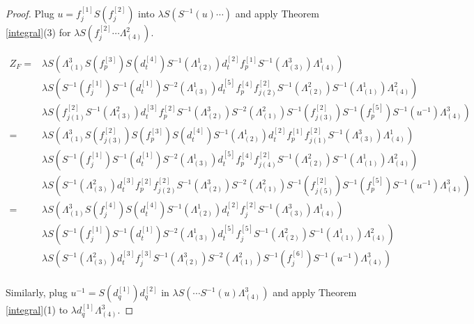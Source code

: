 \documentclass[12pt]{amsart}
\begin{document}
\begin{proof}
Plug $u=f^{[1]}_jS(f^{[2]}_j)$ into $\lambda S(S^{-1}(u)\cdots)$ and apply Theorem \ref{integral}(3) for $\lambda S(f^{[2]}_j\cdots\Lambda^2_{(4)})$.


\[\begin{aligned}
Z_F=&\lambda S(\Lambda^3_{(1)}S(f^{[3]}_p)S(d^{[4]}_t)S^{-1}(\Lambda^1_{(2)})d^{[2]}_tf^{[1]}_pS^{-1}(\Lambda^3_{(3)})\Lambda^1_{(4)})\\
&\lambda S(S^{-1}(f^{[1]}_j)S^{-1}(d^{[1]}_t)S^{-2}(\Lambda^1_{(3)})d^{[5]}_tf^{[4]}_pf^{[2]}_{j(2)}S^{-1}(\Lambda^2_{(2)})S^{-1}(\Lambda^1_{(1)})\Lambda^2_{(4)})\\
&\lambda S(f^{[2]}_{j(1)}S^{-1}(\Lambda^2_{(3)})d^{[3]}_tf^{[2]}_pS^{-1}(\Lambda^3_{(2)})S^{-2}(\Lambda^2_{(1)})S^{-1}(f^{[2]}_{j(3)})S^{-1}(f^{[5]}_p)S^{-1}(u^{-1})\Lambda^3_{(4)})\\
=&\lambda S(\Lambda^3_{(1)}S(f^{[2]}_{j(3)})S(f^{[3]}_p)S(d^{[4]}_t)S^{-1}(\Lambda^1_{(2)})d^{[2]}_tf^{[1]}_pf^{[2]}_{j(1)}S^{-1}(\Lambda^3_{(3)})\Lambda^1_{(4)})\\
&\lambda S(S^{-1}(f^{[1]}_j)S^{-1}(d^{[1]}_t)S^{-2}(\Lambda^1_{(3)})d^{[5]}_tf^{[4]}_pf^{[2]}_{j(4)}S^{-1}(\Lambda^2_{(2)})S^{-1}(\Lambda^1_{(1)})\Lambda^2_{(4)})\\
&\lambda S(S^{-1}(\Lambda^2_{(3)})d^{[3]}_tf^{[2]}_pf^{[2]}_{j(2)}S^{-1}(\Lambda^3_{(2)})S^{-2}(\Lambda^2_{(1)})S^{-1}(f^{[2]}_{j(5)})S^{-1}(f^{[5]}_p)S^{-1}(u^{-1})\Lambda^3_{(4)})\\
=&\lambda S(\Lambda^3_{(1)}S(f^{[4]}_j)S(d^{[4]}_t)S^{-1}(\Lambda^1_{(2)})d^{[2]}_tf^{[2]}_jS^{-1}(\Lambda^3_{(3)})\Lambda^1_{(4)})\\
&\lambda S(S^{-1}(f^{[1]}_j)S^{-1}(d^{[1]}_t)S^{-2}(\Lambda^1_{(3)})d^{[5]}_tf^{[5]}_jS^{-1}(\Lambda^2_{(2)})S^{-1}(\Lambda^1_{(1)})\Lambda^2_{(4)})\\
&\lambda S(S^{-1}(\Lambda^2_{(3)})d^{[3]}_tf^{[3]}_jS^{-1}(\Lambda^3_{(2)})S^{-2}(\Lambda^2_{(1)})S^{-1}(f^{[6]}_j)S^{-1}(u^{-1})\Lambda^3_{(4)})\\
\end{aligned}\]

Similarly, plug $u^{-1}=S(d^{[1]}_q)d^{[2]}_q$ in $\lambda S(\cdots S^{-1}(u)\Lambda^3_{(4)})$ and apply Theorem \ref{integral}(1) to $\lambda d^{[1]}_q\Lambda^3_{(4)}$.



\end{proof}
\end{document}
